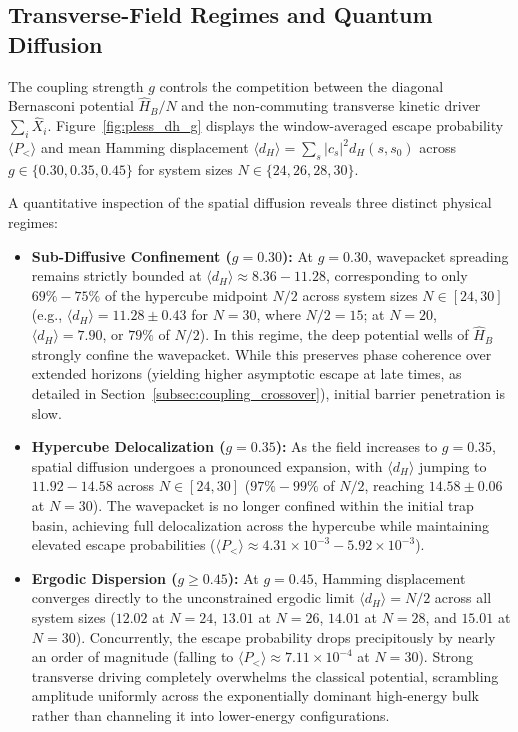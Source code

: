 \documentclass[10pt,twocolumn,a4paper]{article}
\begin{document}
\subsection{Transverse-Field Regimes and Quantum Diffusion}
\label{subsec:field_regimes}
The coupling strength $g$ controls the competition between the diagonal Bernasconi potential $\hat{H}_B / N$ and the non-commuting transverse kinetic driver $\sum_i \hat{X}_i$. Figure~\ref{fig:pless_dh_g} displays the window-averaged escape probability $\langle P_< \rangle$ and mean Hamming displacement $\langle d_H \rangle = \sum_s |c_s|^2 d_H(s, s_0)$ across $g \in \{0.30, 0.35, 0.45\}$ for system sizes $N \in \{24, 26, 28, 30\}$.

A quantitative inspection of the spatial diffusion reveals three distinct physical regimes:
\begin{itemize}
    \item \textbf{Sub-Diffusive Confinement ($g = 0.30$):} At $g = 0.30$, wavepacket spreading remains strictly bounded at $\langle d_H \rangle \approx 8.36 - 11.28$, corresponding to only $69\% - 75\%$ of the hypercube midpoint $N/2$ across system sizes $N \in [24, 30]$ (e.g., $\langle d_H \rangle = 11.28 \pm 0.43$ for $N = 30$, where $N/2 = 15$; at $N = 20$, $\langle d_H \rangle = 7.90$, or $79\%$ of $N/2$). In this regime, the deep potential wells of $\hat{H}_B$ strongly confine the wavepacket. While this preserves phase coherence over extended horizons (yielding higher asymptotic escape at late times, as detailed in Section~\ref{subsec:coupling_crossover}), initial barrier penetration is slow.
    \item \textbf{Hypercube Delocalization ($g = 0.35$):} As the field increases to $g = 0.35$, spatial diffusion undergoes a pronounced expansion, with $\langle d_H \rangle$ jumping to $11.92 - 14.58$ across $N \in [24, 30]$ ($97\% - 99\%$ of $N/2$, reaching $14.58 \pm 0.06$ at $N = 30$). The wavepacket is no longer confined within the initial trap basin, achieving full delocalization across the hypercube while maintaining elevated escape probabilities ($\langle P_< \rangle \approx 4.31 \times 10^{-3} - 5.92 \times 10^{-3}$).
    \item \textbf{Ergodic Dispersion ($g \ge 0.45$):} At $g = 0.45$, Hamming displacement converges directly to the unconstrained ergodic limit $\langle d_H \rangle = N/2$ across all system sizes ($12.02$ at $N=24$, $13.01$ at $N=26$, $14.01$ at $N=28$, and $15.01$ at $N = 30$). Concurrently, the escape probability drops precipitously by nearly an order of magnitude (falling to $\langle P_< \rangle \approx 7.11 \times 10^{-4}$ at $N = 30$). Strong transverse driving completely overwhelms the classical potential, scrambling amplitude uniformly across the exponentially dominant high-energy bulk rather than channeling it into lower-energy configurations.
\end{itemize}
\end{document}

